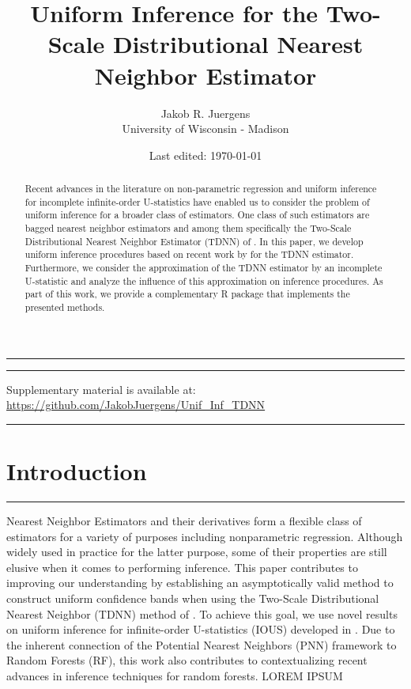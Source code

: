 \documentclass[letterpaper,10pt]{article}
\numberwithin{equation}{section}
\numberwithin{theorem}{section}
\theoremstyle{definition}
\newcommand{\1}{\mathbb{1}}
\begin{document}
\singlespacing
\title{Uniform Inference for the Two-Scale Distributional Nearest Neighbor Estimator}
\date{Last edited: \today}
\author{Jakob R. Juergens \\ University of Wisconsin - Madison}
\maketitle
\hrule
\onehalfspacing
\begin{abstract}
	Recent advances in the literature on non-parametric regression and uniform inference for incomplete infinite-order U-statistics have enabled us to consider the problem of uniform inference for a broader class of estimators.
	One class of such estimators are bagged nearest neighbor estimators and among them specifically the Two-Scale Distributional Nearest Neighbor Estimator (TDNN) of \citet{demirkaya_optimal_2024}.
	In this paper, we develop uniform inference procedures based on recent work by \citet{ritzwoller_uniform_2024} for the TDNN estimator.
	Furthermore, we consider the approximation of the TDNN estimator by an incomplete U-statistic and analyze the influence of this approximation on inference procedures.
	As part of this work, we provide a complementary R package that implements the presented methods.
\end{abstract}
\vspace{0.3cm}
\hrule
\singlespacing

\vspace{-0.3cm}
\begin{center}
	{\small Supplementary material is available at: \url{https://github.com/JakobJuergens/Unif_Inf_TDNN}}
\end{center}
\vspace{0.3cm}
\hrule
\singlespacing
{\small \tableofcontents}
\thispagestyle{empty}


\newpage
\onehalfspacing
\section{Introduction}
\hrule
Nearest Neighbor Estimators and their derivatives form a flexible class of estimators for a variety of purposes including nonparametric regression.
Although widely used in practice for the latter purpose, some of their properties are still elusive when it comes to performing inference.
This paper contributes to improving our understanding by establishing an asymptotically valid method to construct uniform confidence bands when using the Two-Scale Distributional Nearest Neighbor (TDNN) method of \citet{demirkaya_optimal_2024}.
To achieve this goal, we use novel results on uniform inference for infinite-order U-statistics (IOUS) developed in \citet{ritzwoller_uniform_2024}.
Due to the inherent connection of the Potential Nearest Neighbors (PNN) framework to Random Forests (RF), this work also contributes to contextualizing recent advances in inference techniques for random forests.
	{\color{red} LOREM IPSUM}
\end{document}
